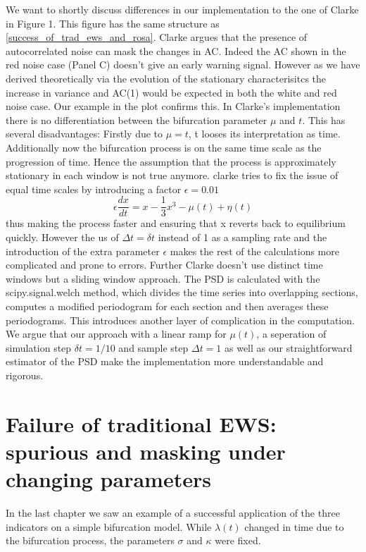 \documentclass[%
thesis=student,%
coverpage=false,%
titlepage=false,%
headmarks=true, %
german,%
font=libertine, %
math=newpxtx, %
BCOR=5mm,%
coverBCOR=11mm%
]{tumbook}
\begin{document}
We want to shortly discuss differences in our implementation to the one of Clarke in \cite{Clarke:2023} Figure 1. This figure has the same structure as \ref{success_of_trad_ews_and_rosa}. Clarke argues that the presence of autocorrelated noise can mask the changes in AC. Indeed the AC shown in the red noise case (Panel C) doesn't give an early warning signal. However as we have derived theoretically via the evolution of the stationary characterisitcs the increase in variance and AC(1) would be expected in both the white and red noise case. Our example in the plot confirms this. 
In Clarke's implementation there is no differentiation between the bifurcation parameter $\mu$ and $t$. This has several disadvantages: Firstly due to $\mu = t$, t looses its interpretation as time. Additionally now the bifurcation process is on the same time scale as the progression of time. Hence the assumption that the process is approximately stationary in each window is not true anymore. clarke tries to fix the issue of equal time scales by introducing a factor $\epsilon = 0.01$
\[
\epsilon\frac{dx}{dt} = x - \frac{1}{3}x^3-\mu(t) + \eta(t)
\]
thus making the process faster and ensuring that x reverts back to equilibrium quickly. However the us of $\Delta t = \delta t$ instead of 1 as a sampling rate and the introduction of the extra parameter $\epsilon$ makes the rest of the calculations more complicated and prone to errors. Further Clarke doesn't use distinct time windows but a sliding window approach. The PSD is calculated with the scipy.signal.welch method, which divides the time series into overlapping sections, computes a modified periodogram for each section and then averages these periodograms. This introduces another layer of complication in the computation. 
We argue that our approach with a linear ramp for $\mu(t)$, a seperation of simulation step $\delta t = 1/10$ and sample step $\Delta t = 1$ as well as our straightforward estimator of the PSD make the implementation more understandable and rigorous.



\chapter{Failure of traditional EWS: spurious and masking under changing parameters}

In the last chapter we saw an example of a successful application of the three indicators on a simple bifurcation model. While $\lambda(t)$ changed in time due to the bifurcation process, the parameters $\sigma$ and $\kappa$ were fixed. 
\end{document}
